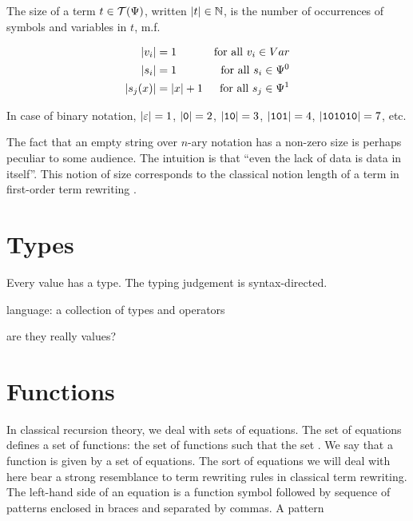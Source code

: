 \begin{definition} \label{def:single-sort-word-term-size} The size of a term $t
\in \mathcal{T}{\mathopen{}\left({\Psi}\right)\mathclose{}}$, written ${\mathopen{}\left|{t}\right|\mathclose{}} \in \mathbb{N}$, is the number of
occurrences of symbols and variables in $t$, m.f.

\begin{align*}
{\ensuremath{\mathopen{}\left|{v_i}\right|\mathclose{}}} &= 1 & \text{for all $v_i \in Var$} \\
{\mathopen{}\left|{s_i}\right|\mathclose{}} &= 1 & \text{for all $s_i\in \Psi^0$} \\
{\mathopen{}\left|{s_j{\mathopen{}\left({x}\right)\mathclose{}}}\right|\mathclose{}} &= {\mathopen{}\left|{x}\right|\mathclose{}} + 1 & \text{for all $s_j \in \Psi^1$}
\end{align*}

\end{definition}

\begin{example} In case of binary notation, ${\mathopen{}\left|{\varepsilon}\right|\mathclose{}}=1$,
${\mathopen{}\left|{\mathtt{0}}\right|\mathclose{}} = 2$, ${\mathopen{}\left|{\mathtt{1}\mathtt{0}}\right|\mathclose{}} = 3$,
${\mathopen{}\left|{\mathtt{1}\mathtt{0}\mathtt{1}}\right|\mathclose{}} = 4$,
${\mathopen{}\left|{\mathtt{1}\mathtt{0}\mathtt{1}\mathtt{0}\mathtt{1}\mathtt{0}}\right|\mathclose{}} = 7$, etc.
\end{example}

\begin{remark} The fact that an empty string over $n$-ary notation has a
non-zero size is perhaps peculiar to some audience. The intuition is that
``even the lack of data is data in itself''. This notion of size corresponds to
the classical notion length of a term in first-order term rewriting
\cite{klop-vrijer-2003}. \end{remark}

\section{Types}

Every value has a type. The typing judgement is syntax-directed.

language: a collection of types and operators

are they really values?

\section{Functions}

In classical recursion theory, we deal with sets of equations.  The set of
equations defines a set of functions: the set of functions such that the set .
We say that a function is given by a set of equations. The sort of equations we
will deal with here bear a strong resemblance to term rewriting rules in
classical term rewriting. The left-hand side of an equation is a function
symbol followed by sequence of patterns enclosed in braces and separated by
commas. A pattern 

